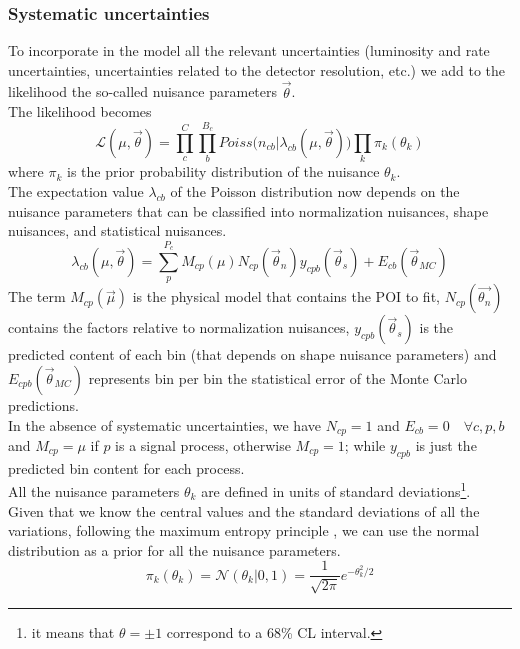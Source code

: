 \subsubsection*{Systematic uncertainties}
To incorporate in the model all the relevant uncertainties (\ie luminosity and rate uncertainties, uncertainties related to the detector resolution, etc.) we add to the likelihood the so-called nuisance parameters $\vec{\theta}$.\\
The likelihood becomes \cite{Conway2011IncorporatingSpectra}
\begin{equation}\label{eq:likelihood}
    \mathcal{L}(\mu,\vec{\theta})=\prod_c^C \prod_b^{B_c} Poiss \big( n_{cb}| \lambda_{cb}(\mu,\vec{\theta}) \big)  \prod_k  \pi_{k}(\theta_k)
\end{equation}
where $\pi_{k}$ is the prior probability distribution of the nuisance $\theta_k$.\\
The expectation value $\lambda_{cb}$ of the Poisson distribution now depends on the nuisance parameters that can be classified into normalization nuisances, shape nuisances, and statistical nuisances.
\begin{equation}\label{eq:lambda}
     \lambda_{cb}( \mu,\vec{\theta})=\sum_p^{P_c}M_{cp}(\mu) N_{cp}(\vec{\theta}_n)y_{cpb}(\vec{\theta}_s)+E_{cb}(\vec{\theta}_{MC})
\end{equation}
The term $M_{cp}(\vec{\mu})$ is the physical model that contains the POI to fit, $N_{cp}(\vec{\theta_n})$ contains the factors relative to normalization nuisances, $y_{cpb}(\vec{\theta}_s)$ is the predicted content of each bin (that depends on shape nuisance parameters) and $E_{cpb}(\vec{\theta}_{MC})$ represents bin per bin the statistical error of the Monte Carlo predictions.\\
In the absence of systematic uncertainties, we have $N_{cp}=1$ and $E_{cb}=0 \quad \forall c,p,b$ and
$M_{cp}=\mu$ if $p$ is a signal process, otherwise $M_{cp}=1$; while $y_{cpb}$ is just the predicted bin content for each process.\\
All the nuisance parameters $\theta_k$ are defined in units of standard deviations\footnote{it means that $\theta=\pm 1$ correspond to a 68\% CL interval.}.\\
Given that we know the central values and the standard deviations of all the variations, following the maximum entropy principle \cite{Jaynes2003ProbabilityScience}, we can use the normal distribution as a prior for all the nuisance parameters.
\begin{equation}
    \pi_k(\theta_k)=\mathcal{N}\left(\theta_k|0,1\right)=\frac{1}{\sqrt{2\pi}}e^{-\theta_k^2/2}
\end{equation}
